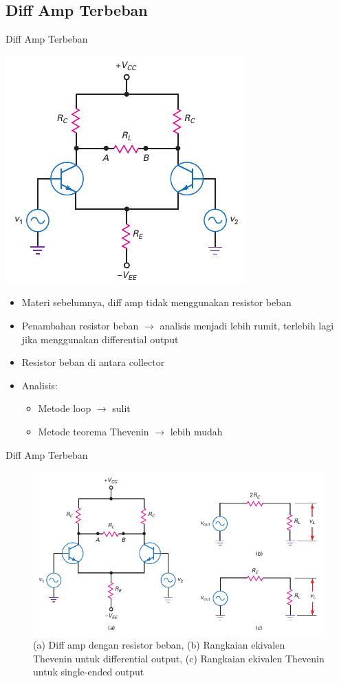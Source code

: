 \documentclass[aspectratio=169]{beamer}
\begin{document}
\subsection{Diff Amp Terbeban}
\begin{frame}{Diff Amp Terbeban}
	\begin{multicols}{2}
		\begin{center}
			\includegraphics[height=0.7\textheight]{gambar/01.fig31a}
		\end{center}
		\columnbreak
		\begin{itemize}
			\item Materi sebelumnya, diff amp tidak menggunakan resistor beban
			\item Penambahan resistor beban $ \rightarrow $ analisis menjadi lebih rumit, terlebih lagi jika menggunakan differential output
			\item Resistor beban di antara collector
			\item Analisis:
			\begin{itemize}
				\item Metode loop $ \rightarrow $ sulit
				\item Metode teorema Thevenin $ \rightarrow $ lebih mudah
			\end{itemize}
		\end{itemize}
	\end{multicols}
\end{frame}

\begin{frame}{Diff Amp Terbeban}
	\begin{figure}
		\centering
		\includegraphics[width=0.7\linewidth]{gambar/01.fig31}
		\caption{(a) Diff amp dengan resistor beban, (b) Rangkaian ekivalen Thevenin untuk differential output, (c) Rangkaian ekivalen Thevenin untuk single-ended output}
		\label{fig:31}
	\end{figure}
\end{frame}
\end{document}
